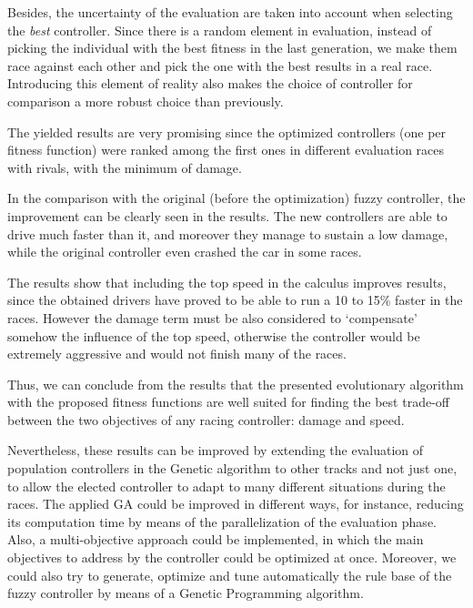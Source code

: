 \documentclass[conference]{IEEEtran}
\begin{document}
Besides, the uncertainty of the evaluation are taken into account when
selecting the {\em best} controller. Since there is a random element
in evaluation, instead of picking the individual with the best fitness
in the last generation, we make them race against each other and pick
the one with the best results in a real race. Introducing this element
of reality also makes the choice of controller for comparison a more
robust choice than previously. 

The yielded results are very promising since the optimized controllers
(one per fitness function) were ranked among the first ones in 
different evaluation races with rivals, with the minimum of damage. 

In the comparison with the original (before the optimization) fuzzy
controller, the improvement can be clearly seen in the results. The
new controllers are able to drive much faster than it, and moreover
they manage to sustain a low damage, while the original controller
even crashed the car in some races. %

The results show that including the top speed in the calculus improves
results, since the obtained drivers have proved to be able to run a 10
to 15\% faster in the races. However the damage term must be also
considered to `compensate' somehow the influence of the top speed,
otherwise the controller would be extremely aggressive and would not
finish many of the races.

Thus, we can conclude from the results that the presented evolutionary
algorithm with the
proposed fitness functions are well suited for finding the best
trade-off between the two objectives of any racing controller: damage
and speed. 

Nevertheless, these results can be improved by extending the
evaluation of population controllers in the Genetic algorithm to other
tracks and not just one, to allow the elected controller to adapt to many different situations during the races.
The applied GA could be improved in different ways, for instance, reducing its computation time by means of the parallelization of the evaluation phase.
Also, a multi-objective approach could be implemented, in which the main objectives to address by the controller could be optimized at once.
Moreover, we could also try to generate, optimize and tune
automatically the rule base of the fuzzy controller by means of a
Genetic Programming algorithm.  
\end{document}
